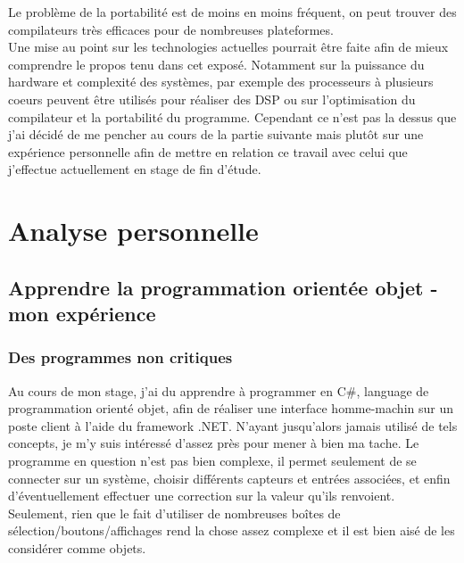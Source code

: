 \documentclass[12pt]{article} %
\begin{document}
Le problème de la portabilité est de moins en moins fréquent, on peut trouver des compilateurs très efficaces pour de nombreuses plateformes.\cite{MulticoreDSP}\cite{JustInTime}\\


Une mise au point sur les technologies actuelles pourrait être faite afin de mieux comprendre le propos tenu dans cet exposé. 
Notamment sur la puissance du hardware et complexité des systèmes, par exemple des processeurs à plusieurs coeurs peuvent être utilisés pour réaliser des DSP\cite{MulticoreDSP} ou sur l'optimisation du compilateur et la portabilité du programme.
Cependant ce n'est pas la dessus que j'ai décidé de me pencher au cours de la partie suivante mais plutôt sur une expérience personnelle afin de mettre en relation ce travail avec celui que j'effectue actuellement en stage de fin d'étude.


\newpage
\section{Analyse personnelle}
\subsection{Apprendre la programmation orientée objet - mon expérience}
\subsubsection{Des programmes non critiques}
Au cours de mon stage, j'ai du apprendre à programmer en C\#, language de programmation orienté objet, afin de réaliser une interface homme-machin sur un poste client à l'aide du framework .NET.
N'ayant jusqu'alors jamais utilisé de tels concepts, je m'y suis intéressé d'assez près pour mener à bien ma tache.
Le programme en question n'est pas bien complexe, il permet seulement de se connecter sur un système, choisir différents capteurs et entrées associées, et enfin d'éventuellement effectuer une correction sur la valeur qu'ils renvoient.
Seulement, rien que le fait d'utiliser de nombreuses boîtes de sélection/boutons/affichages rend la chose assez complexe et il est bien aisé de les considérer comme objets.
\end{document}
